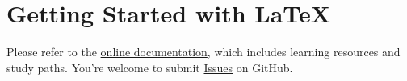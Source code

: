 \section{Getting Started with \LaTeX}
Please refer to the \href{https://tex.readthedocs.io/zh_CN/latest/}{online documentation}, which includes learning resources and study paths. You're welcome to submit \href{https://github.com/Iydon/tex/issues}{Issues} on GitHub.